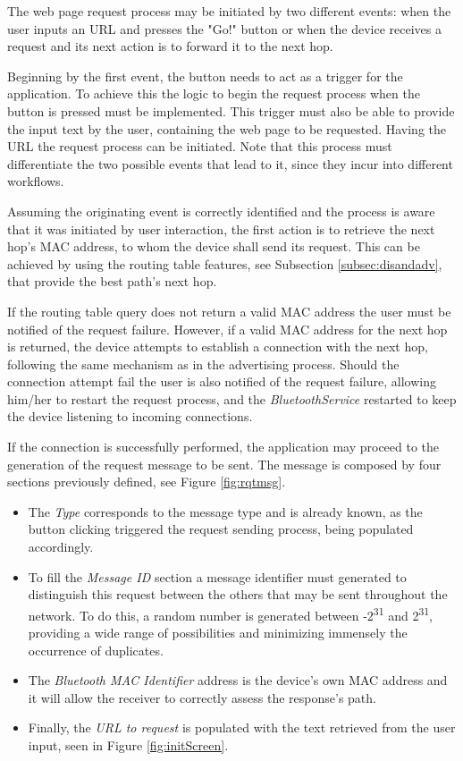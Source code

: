The web page request process may be initiated by two different events: when the user inputs an \gls{URL} and presses the "Go!" button or when the device receives a request and its next action is to forward it to the next hop.

Beginning by the first event, the button needs to act as a trigger for the application. To achieve this the logic to begin the request process when the button is pressed must be implemented. This trigger must also be able to provide the input text by the user, containing the web page to be requested. Having the \gls{URL} the request process can be initiated. Note that this process must differentiate the two possible events that lead to it, since they incur into different workflows.

Assuming the originating event is correctly identified and the process is aware that it was initiated by user interaction, the first action is to retrieve the next hop's \gls{MAC} address, to whom the device shall send its request. This can be achieved by using the routing table features, see Subsection \ref{subsec:disandadv}, that provide the best path's next hop.

If the routing table query does not return a valid \gls{MAC} address the user must be notified of the request failure. However, if a valid \gls{MAC} address for the next hop is returned, the device attempts to establish a connection with the next hop, following the same mechanism as in the advertising process. Should the connection attempt fail the user is also notified of the request failure, allowing him/her to restart the request process, and the \textit{BluetoothService} restarted to keep the device listening to incoming connections.

If the connection is successfully performed, the application may proceed to the generation of the request message to be sent. The message is composed by four sections previously defined, see Figure \ref{fig:rqtmsg}. 

\begin{itemize}
	\item The \textit{Type} corresponds to the message type and is already known, as the button clicking triggered the request sending process, being populated accordingly.
	
	\item To fill the \textit{Message ID} section a message identifier must generated to distinguish this request between the others that may be sent throughout the network. To do this, a random number is generated between -2\textsuperscript{31} and 2\textsuperscript{31}, providing a wide range of possibilities and minimizing immensely the occurrence of duplicates.
	
	\item The \textit{Bluetooth \gls{MAC} Identifier} address is the device's own \gls{MAC} address and it will allow the receiver to correctly assess the response's path.
	
	\item Finally, the \textit{\gls{URL} to request} is populated with the text retrieved from the user input, seen in Figure \ref{fig:initScreen}.
\end{itemize}

